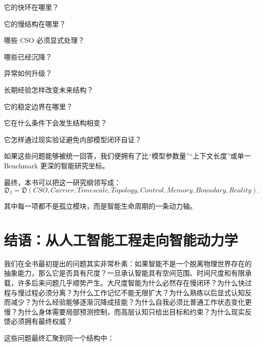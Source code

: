 它的快环在哪里？

它的慢结构在哪里？

哪些 CSO 必须显式处理？

哪些已经沉降？

异常如何升级？

长期经验怎样改变未来结构？

它的稳定边界在哪里？

它在什么条件下会发生结构相变？

它怎样通过现实验证避免内部模型闭环自证？

如果这些问题能够被统一回答，我们便拥有了比“模型参数量”“上下文长度”或单一 Benchmark 更深的智能研究坐标。

最终，本书可以把这一研究纲领写成：
\begin{equation}
\boxed{
\mathfrak{D}_{I}
=
\mathfrak{D}
\left(
CSO,
Carrier,
Timescale,
Topology,
Control,
Memory,
Boundary,
Reality
\right).
}
\end{equation}

其中每一项都不是孤立模块，而是智能生命周期的一条动力轴。

\section{结语：从人工智能工程走向智能动力学}

我们在全书最初提出的问题其实非常朴素：如果智能不是一个脱离物理世界存在的抽象能力，那么它是否具有尺度？一旦承认智能具有空间范围、时间尺度和有限承载，许多后来问题几乎顺势产生。大尺度智能为什么必然存在慢闭环？为什么快过程与慢过程必须分离？为什么工作记忆不能无限扩大？为什么熟练以后显式认知反而减少？为什么经验能够逐渐沉降成技能？为什么自我必须比普通工作状态变化更慢？为什么身体需要局部预测控制，而高层认知只给出目标和约束？为什么现实反馈必须拥有最终权威？

这些问题最终汇聚到同一个结构中：
\begin{statementbox}
\centering
{}
\end{statementbox}

